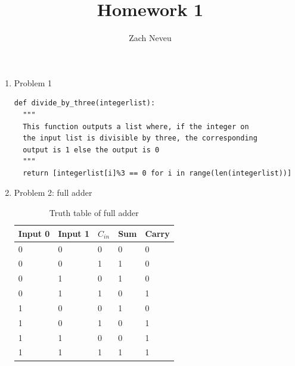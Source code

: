 \documentclass[12pt, letter]{article}
\author{Zach Neveu}
\title{ Homework 1 }
\begin{document}
\maketitle

\begin{enumerate}
	\item Problem 1
\begin{verbatim}
def divide_by_three(integerlist):
  """
  This function outputs a list where, if the integer on
  the input list is divisible by three, the corresponding
  output is 1 else the output is 0
  """
  return [integerlist[i]%3 == 0 for i in range(len(integerlist))]
\end{verbatim}

	\item Problem 2: full adder
	\begin{table}[htpb]
		\centering
		\caption{Truth table of full adder}
		\label{tab:truth_table}
		\begin{tabular}{lllll}
		\toprule
		Input 0 & Input 1 & $C_{in}$ & Sum & Carry \\
		\midrule
		0 & 0 & 0 & 0 & 0 \\
		\midrule
		0 & 0 & 1 & 1 & 0 \\
		\midrule
		0 & 1 & 0 & 1 & 0 \\
		\midrule
		0 & 1 & 1 & 0 & 1 \\
		\midrule
		1 & 0 & 0 & 1 & 0 \\
		\midrule
		1 & 0 & 1 & 0 & 1 \\
		\midrule
		1 & 1 & 0 & 0 & 1 \\
		\midrule
		1 & 1 & 1 & 1 & 1 \\
		\bottomrule	
		\end{tabular}
	\end{table}


\end{enumerate}
\end{document}
